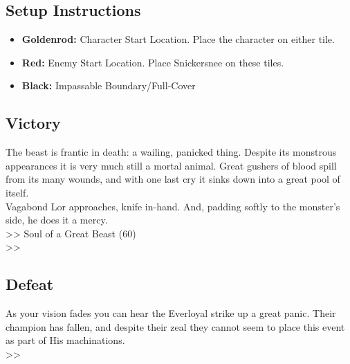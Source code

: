 \subsection*{Setup Instructions}
\begin{itemize}
\item \textbf{Goldenrod:} Character Start Location. Place the character on either tile.
\item \textbf{Red:} Enemy Start Location. Place Snickersnee on these tiles.
\item \textbf{Black:} Impassable Boundary/Full-Cover
\end{itemize}

\pagebreak

\subsection*{Victory}
The beast is frantic in death: a wailing, panicked thing. Despite its monstrous appearances it is very much still a mortal animal. Great gushers of blood spill from its many wounds, and with one last cry it sinks down into a great pool of itself.\\

Vagabond Lor approaches, knife in-hand. And, padding softly to the monster's side, he does it a mercy.\\

>> Soul of a Great Beast (60)\\
>> 

\subsection*{Defeat}
As your vision fades you can hear the Everloyal strike up a great panic. Their champion has fallen, and despite their zeal they cannot seem to place this event as part of His machinations.\\
>> 